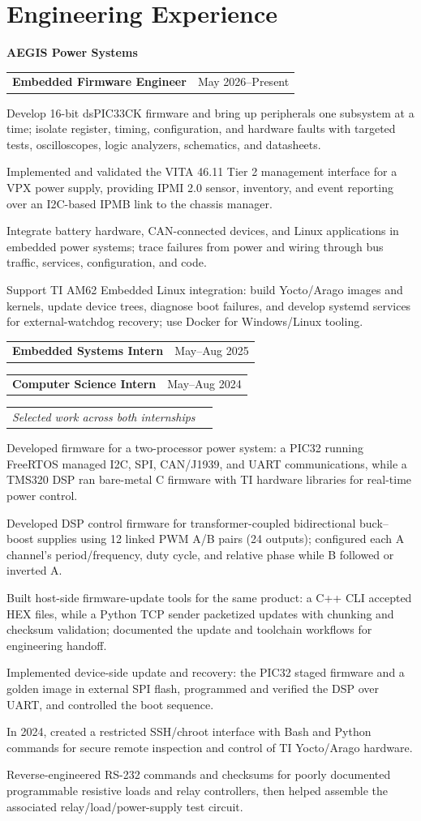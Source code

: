 \documentclass[10pt,letterpaper]{article}
\makeatletter
\newcommand{\companyheader}[1]{%
  {\fontsize{10.4}{10.8}\selectfont\bfseries #1}\par\vspace{-0.03cm}
}
\newcommand{\roleentry}[2]{%
  \begin{tabularx}{\textwidth}{@{}X>{\raggedleft\arraybackslash}p{2.40in}@{}}
    \textbf{#1} & #2
  \end{tabularx}\vspace{-0.075cm}
}
\newcommand{\descriptorentry}[1]{%
  \begin{tabularx}{\textwidth}{@{}X>{\raggedleft\arraybackslash}p{2.40in}@{}}
    \textit{#1} &
  \end{tabularx}\vspace{-0.075cm}
}
\makeatother
\begin{document}
\section{Engineering Experience}
\companyheader{AEGIS Power Systems}
\roleentry{Embedded Firmware Engineer}{May 2026--Present}
\begin{resumebullets}
  \item Develop 16-bit dsPIC33CK firmware and bring up peripherals one subsystem at a time; isolate register, timing, configuration, and hardware faults with targeted tests, oscilloscopes, logic analyzers, schematics, and datasheets.
  \item Implemented and validated the VITA 46.11 Tier 2 management interface for a VPX power supply, providing IPMI 2.0 sensor, inventory, and event reporting over an I2C-based IPMB link to the chassis manager.
  \item Integrate battery hardware, CAN-connected devices, and Linux applications in embedded power systems; trace failures from power and wiring through bus traffic, services, configuration, and code.
  \item Support TI AM62 Embedded Linux integration: build Yocto/Arago images and kernels, update device trees, diagnose boot failures, and develop systemd services for external-watchdog recovery; use Docker for Windows/Linux tooling.
\end{resumebullets}

\roleentry{Embedded Systems Intern}{May--Aug 2025}
\roleentry{Computer Science Intern}{May--Aug 2024}
\descriptorentry{Selected work across both internships}
\begin{resumebullets}
  \item Developed firmware for a two-processor power system: a PIC32 running FreeRTOS managed I2C, SPI, CAN/J1939, and UART communications, while a TMS320 DSP ran bare-metal C firmware with TI hardware libraries for real-time power control.
  \item Developed DSP control firmware for transformer-coupled bidirectional buck--boost supplies using 12 linked PWM A/B pairs (24 outputs); configured each A channel's period/frequency, duty cycle, and relative phase while B followed or inverted A.
  \item Built host-side firmware-update tools for the same product: a C++ CLI accepted HEX files, while a Python TCP sender packetized updates with chunking and checksum validation; documented the update and toolchain workflows for engineering handoff.
  \item Implemented device-side update and recovery: the PIC32 staged firmware and a golden image in external SPI flash, programmed and verified the DSP over UART, and controlled the boot sequence.
  \item In 2024, created a restricted SSH/chroot interface with Bash and Python commands for secure remote inspection and control of TI Yocto/Arago hardware.
  \item Reverse-engineered RS-232 commands and checksums for poorly documented programmable resistive loads and relay controllers, then helped assemble the associated relay/load/power-supply test circuit.
\end{resumebullets}
\end{document}
